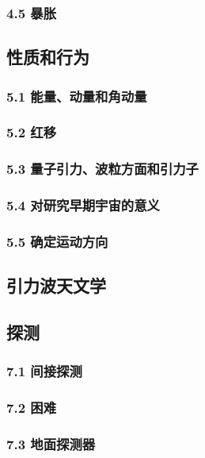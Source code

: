\subsubsection{4.5 暴胀}

\subsection{性质和行为}

\subsubsection{5.1 能量、动量和角动量}

\subsubsection{5.2 红移}

\subsubsection{5.3 量子引力、波粒方面和引力子}

\subsubsection{5.4 对研究早期宇宙的意义}

\subsubsection{5.5 确定运动方向}

\subsection{引力波天文学}

\subsection{探测}

\subsubsection{7.1 间接探测}

\subsubsection{7.2 困难}

\subsubsection{7.3 地面探测器}

